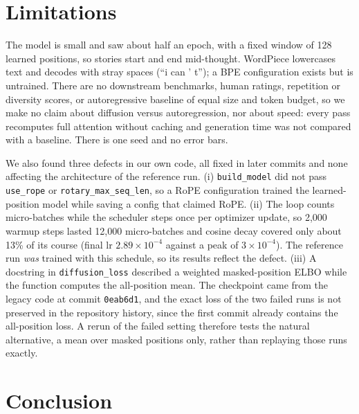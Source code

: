 \documentclass[conference]{IEEEtran}
\begin{document}
\section{Limitations}

The model is small and saw about half an epoch, with a fixed window of 128
learned positions, so stories start and end mid-thought. WordPiece lowercases
text and decodes with stray spaces (``i can ' t''); a BPE configuration exists
but is untrained. There are no downstream benchmarks, human ratings,
repetition or diversity scores, or autoregressive baseline of equal size and
token budget, so we make no claim about diffusion versus autoregression, nor
about speed: every pass recomputes full attention without caching and
generation time was not compared with a baseline. There is one seed and no
error bars.

We also found three defects in our own code, all fixed in later commits and
none affecting the architecture of the reference run. (i) \texttt{build\_model}
did not pass \texttt{use\_rope} or \texttt{rotary\_max\_seq\_len}, so a RoPE
configuration trained the learned-position model while saving a config that
claimed RoPE. (ii) The loop counts micro-batches while the scheduler steps once
per optimizer update, so 2,000 warmup steps lasted 12,000 micro-batches and
cosine decay covered only about 13\% of its course (final lr
$2.89{\times}10^{-4}$ against a peak of $3{\times}10^{-4}$). The reference run
\emph{was} trained with this schedule, so its results reflect the defect.
(iii) A docstring in \texttt{diffusion\_loss} described a weighted
masked-position ELBO while the function computes the all-position mean. The
checkpoint came from the legacy code at commit \texttt{0eab6d1}, and the exact
loss of the two failed runs is not preserved in the repository history, since
the first commit already contains the all-position loss. A rerun of the failed
setting therefore tests the natural alternative, a mean over masked positions
only, rather than replaying those runs exactly.

\section{Conclusion}
\end{document}
